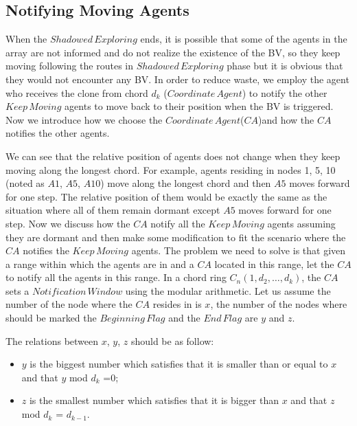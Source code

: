 \subsection{Notifying Moving Agents}


When the $Shadowed\,Exploring$ ends, it is possible that some of the agents in the array are not informed and do not realize the existence of the BV, so they keep moving following the routes in $Shadowed\,Exploring$  phase but it is obvious that they would not encounter any BV. In order to reduce waste, we employ the agent who receives the clone from chord $d_k$ ($Coordinate\,Agent$) to notify the other $Keep\,Moving$ agents to move back to their position when the BV is triggered. Now we introduce how we choose the $Coordinate\,Agent$($CA$)and how the $CA$ notifies the other agents.\\


We can see that the relative position of agents does not change when they keep moving along the longest chord. For example, agents residing in nodes 1, 5, 10 (noted as $A1$, $A5$, $A10$) move along the longest chord and then $A5$ moves forward for one step. The relative position of them would be exactly the same as the situation where all of them remain dormant except $A5$ moves forward for one step. Now we discuss how the $CA$ notify all the $Keep\,Moving$ agents assuming they are dormant and then make some modification to fit the scenario where the $CA$ notifies the $Keep\,Moving$ agents. The problem we need to solve is that given a range within which the agents are in and a $CA$ located in this range, let the $CA$ to notify all the agents in this range. In a chord ring $C_n(1, d_2, \ldots, d_k)$, the $CA$ sets a $Notification\,Window$ using the modular arithmetic. Let us assume the number of the node where the $CA$ resides in is $x$, the number of the nodes where should be marked the $Beginning\,Flag$ and the $End\,Flag$ are $y$ and $z$. 

The relations between $x$, $y$, $z$ should be as follow: 

\begin{itemize}
\item $y$ is the biggest number which satisfies that it is smaller than or equal to $x$ and that $y$ mod $d_k$ =$0$; 
\item $z$ is the smallest number which satisfies that it is bigger than $x$ and that $z$ mod $d_k$ = $d_{k-1}$.
\end{itemize} 



